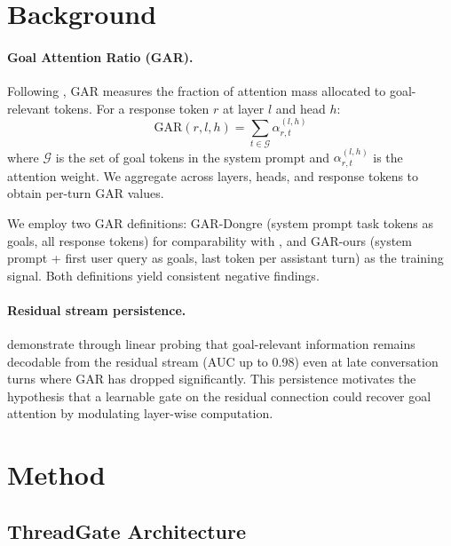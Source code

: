 \documentclass[11pt]{article}
\begin{document}
\section{Background}
\label{sec:background}

\paragraph{Goal Attention Ratio (GAR).}
Following \citet{dongre2026multi}, GAR measures the fraction of attention mass allocated to goal-relevant tokens. For a response token $r$ at layer $l$ and head $h$:
\begin{equation}
\text{GAR}(r, l, h) = \sum_{t \in \mathcal{G}} \alpha_{r,t}^{(l,h)}
\end{equation}
where $\mathcal{G}$ is the set of goal tokens in the system prompt and $\alpha_{r,t}^{(l,h)}$ is the attention weight.
We aggregate across layers, heads, and response tokens to obtain per-turn GAR values.

We employ two GAR definitions: GAR-Dongre (system prompt task tokens as goals, all response tokens) for comparability with \citet{dongre2026multi}, and GAR-ours (system prompt + first user query as goals, last token per assistant turn) as the training signal.
Both definitions yield consistent negative findings.

\paragraph{Residual stream persistence.}
\citet{dongre2026multi} demonstrate through linear probing that goal-relevant information remains decodable from the residual stream (AUC up to 0.98) even at late conversation turns where GAR has dropped significantly.
This persistence motivates the hypothesis that a learnable gate on the residual connection could recover goal attention by modulating layer-wise computation.

\section{Method}
\label{sec:method}

\subsection{ThreadGate Architecture}
\end{document}
